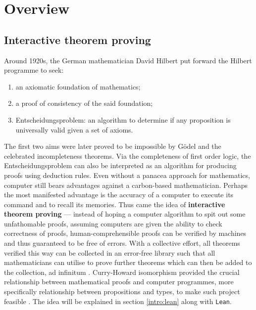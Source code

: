 \documentclass{report}
\theoremstyle{definition}
\theoremstyle{plain}
\begin{document}

\tableofcontents

\chapter{Overview}
\section{Interactive theorem proving}
Around 1920s, the German mathematician David Hilbert put forward the Hilbert programme to seek:
\begin{enumerate}
  \item an axiomatic foundation of mathematics;
  \item a proof of consistency of the said foundation;
  \item Entscheidungsproblem: an algorithm to determine if any proposition is universally valid given a set of axioms.
\end{enumerate}
The first two aims were later proved to be impossible by Gödel and the celebrated incompleteness theorems. Via the completeness of first order logic, the Entscheidungsproblem can also be interpreted as an algorithm for producing proofs using deduction rules. Even without a panacea approach for mathematics, computer still bears advantages against a carbon-based mathematician. Perhaps the most manifested advantage is the accuracy of a computer to execute its command and to recall its memories. Thus came the idea of {\bf interactive theorem proving} --- instead of hoping a computer algorithm to spit out some unfathomable proofs, assuming computers are given the ability to check correctness of proofs, human-comprehensible proofs can be verified by machines and thus guaranteed to be free of errors. With a collective effort, all theorems verified this way can be collected in an error-free library such that all mathematicians can utilise to prove further theorems which can then be added to the collection, ad infinitum \cite{boyer1994qed}. Curry-Howard isomorphism provided the crucial relationship between mathematical proofs and computer programmes, more specifically relationship between propositions and types, to make such project feasible \cite{kennedy2011set}. The idea will be explained in section \ref{intro:lean} along with {\tt \small Lean}. 
\end{document}
